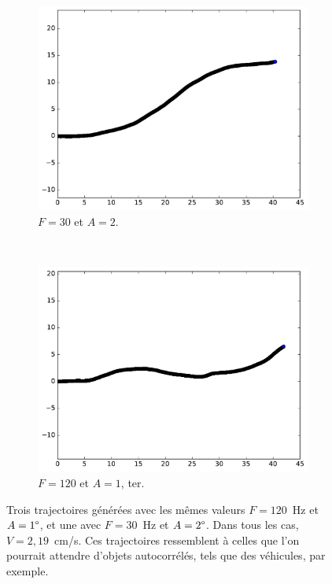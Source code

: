 \begin{figure}[!htb]
\begin{subfigure}[t]{0.49\textwidth}
			\centering
			\includegraphics[width=\textwidth]{figures/ch4/ac_2_19_2_30}
			\caption[Mouvement pseudo-autocorrélé B]{$F = 30$ et $A = 2$.}
			\label{fig:ac_2_30}
		\end{subfigure}		
		~
		\begin{subfigure}[t]{0.49\textwidth}
			\centering
			\includegraphics[width=\textwidth]{figures/ch4/ac_2_19_2_60}
			\caption[Mouvement pseudo-autocorrélé B]{$F = 120$ et $A = 1$, ter.}
			\label{fig:ac_1_120C}
		\end{subfigure}
		\caption{Trois trajectoires générées avec les mêmes valeurs $F = 120$~Hz et $A = 1\degree$, et une avec $F = 30$~Hz et $A = 2\degree$. Dans tous les cas, $V = 2,19$~cm/s. Ces trajectoires ressemblent à celles que l'on pourrait attendre d'objets autocorrélés, tels que des véhicules, par exemple.}
		\label{fig:autocorr}
	\end{figure}
    
